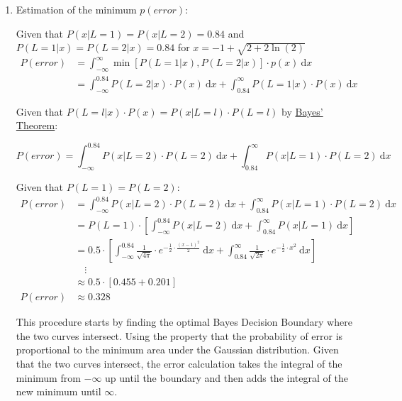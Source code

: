 \documentclass[12pt,A4]{article}
\begin{document}
\begin{enumerate}
    \item Estimation of the minimum $p(error)$:
    
    Given that $P(x|L=1)=P(x|L=2)=0.84$ and $P(L=1|x) = P(L=2|x)=0.84$ for $x=-1+\sqrt{2+2\ln(2)}$\\
    \begin{align*}
        P(error) &= \int_{-\infty}^{\infty}\min[P(L=1|x), P(L=2|x)]\cdot p(x)\ \mathrm{d}x \\
        &= \int_{-\infty}^{0.84}P(L=2|x)\cdot P(x) \ \mathrm{d}x + \int_{0.84}^{\infty}P(L=1|x)\cdot P(x) \ \mathrm{d}x
    \end{align*}
    
    Given that $P(L=l|x)\cdot P(x) = P(x|L=l)\cdot P(L=l)$ by \href{https://en.wikipedia.org/wiki/Bayes\%27_theorem}{Bayes' Theorem}:
    
    $$P(error) = \int_{-\infty}^{0.84}P(x|L=2)\cdot P(L=2) \ \mathrm{d}x + \int_{0.84}^{\infty}P(x|L=1)\cdot P(L=2) \ \mathrm{d}x$$
    
    Given that $P(L=1)=P(L=2)$:
    \begin{align*}
        P(error) &= \int_{-\infty}^{0.84}P(x|L=2)\cdot P(L=2) \ \mathrm{d}x + \int_{0.84}^{\infty}P(x|L=1)\cdot P(L=2) \ \mathrm{d}x \\
        &= P(L=1)\cdot \left[ \int_{-\infty}^{0.84}P(x|L=2) \ \mathrm{d}x + \int_{0.84}^{\infty}P(x|L=1) \ \mathrm{d}x \right] \\
        &= 0.5 \cdot \left[ \int_{-\infty}^{0.84}\frac{1}{\sqrt{4\pi}} \cdot e^{-\frac{1}{2} \cdot \frac{(x-1)^2}{2}} \ \mathrm{d}x + \int_{0.84}^{\infty}\frac{1}{\sqrt{2\pi}} \cdot e^{-\frac{1}{2} \cdot x^2} \ \mathrm{d}x \right] \\
        &\quad \vdots \\
        &\approx 0.5 \cdot \left[ 0.455 + 0.201\right] \\
        P(error) &\approx 0.328
    \end{align*}
    
    This procedure starts by finding the optimal Bayes Decision Boundary where the two curves intersect. Using the property that the probability of error is proportional to the minimum area under the Gaussian distribution. Given that the two curves intersect, the error calculation takes the integral of the minimum from $-\infty$ up until the boundary and then adds the integral of the new minimum until $\infty$.
    

\end{enumerate}
\end{document}
